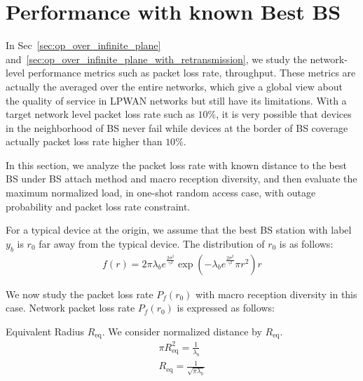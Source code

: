 \section{Performance with known Best BS}
In Sec~\ref{sec:op_over_infinite_plane} and~\ref{sec:op_over_infinite_plane_with_retransmission}, we study the network-level performance metrics such as packet loss rate, throughput. These metrics are actually the averaged over the entire networks, which give a global view about the quality of service in LPWAN networks but still have its limitations. With a target network level packet loss rate such as $10\%$, it is very possible that devices in the neighborhood of BS never fail while devices at the border of BS coverage actually packet loss rate higher than $10\%$.

In this section, we analyze the packet loss rate with known distance to the best BS under BS attach method and macro reception diversity, and then evaluate the maximum normalized load, in one-shot random access case, with outage probability and packet loss rate constraint. 

For a typical device at the origin, we assume that the best BS station with label $y_b$ is $r_{0}$ far away from the typical device. The distribution of $r_0$ is as follows:
\begin{align}
\label{eq:pdf_modified_r_0}
f(r) = 2 \pi \lambda_b e^{\frac{2\sigma^2}{\gamma^2}}  \exp( -\lambda_b  e^{\frac{2\sigma^2}{\gamma^2}} \pi r^2 ) r 
\end{align}

We now study the packet loss rate $P_{f}(r_{0})$ with macro reception diversity in this case. Network packet loss rate $P_{f}(r_{0})$ is expressed as follows:





Equivalent Radius $R_{\text{eq}}$. We consider normalized distance by $R_{\text{eq}}$.
\begin{align}
	\pi R_{\text{eq}} ^ 2 = \frac{1}{\lambda_{b}} \\
	 R_{\text{eq}}  = \frac{1}{\sqrt{\pi \lambda_{b}}}
\end{align}

